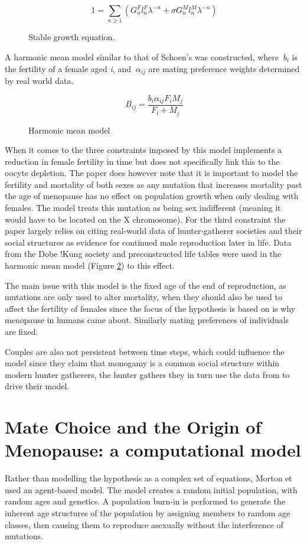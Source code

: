 \documentclass[authoryearcitations]{UoYCSproject}
\begin{document}
\begin{figure}[h]
$$\ 1 = \sum_{n\geq 1}(G_n^Fl_n^F\lambda ^{-n} + \sigma G_n^Ml_n^M\lambda ^{-n}) $$
\caption{Stable growth equation.}
\label{fig:stableGrowth}
\end{figure}


A harmonic mean model similar to that of Schoen's \cite{schoen1981harmonic} was constructed, where $\ b_i $ is the fertility of a female aged \textit{i}, and $\ \alpha_{ij} $ are mating preference weights determined by real world data.

\begin{figure}[h]
$$\ B_{ij} = \frac{b_i\alpha_{ij}F_iM_j}{F_i + M_j} $$
\caption{Harmonic mean model}
\label{fig:harmonicMean}
\end{figure}

When it comes to the three constraints imposed by \cite{patriarchHypothesis2000} this model implements a reduction in female fertility in time but does not specifically link this to the oocyte depletion. The paper does however note that it is important to model the fertility and mortality of both sexes as any mutation that increases mortality past the age of menopause has no effect on population growth when only dealing with females. The model treats this mutation as being sex indifferent (meaning it would have to be located on the X chromosome). For the third constraint the paper largely relies on citing real-world data of hunter-gatherer societies and their social structures as evidence for continued male reproduction later in life. Data from the Dobe !Kung society \cite{howell1979demography} and preconstructed life tables \cite{gurven2007hunter} were used in the harmonic mean model (Figure \ref{fig:harmonicMean}) to this effect.

The main issue with this model is the fixed age of the end of reproduction, as mutations are only used to alter mortality, when they should also be used to affect the fertility of females since the focus of the hypothesis is based on is why menopause in humans came about. Similarly mating preferences of individuals are fixed.

Couples are also not persistent between time steps, which could influence the model since they claim that monogamy is a common social structure within modern hunter gatherers, the hunter gathers they in turn use the data from to drive their model. 

\section{Mate Choice and the Origin of Menopause: a computational model}
Rather than modelling the hypothesis as a complex set of equations, Morton et \cite{mateChoice2013} used an agent-based model. The model creates a random initial population, with random ages and genetics. A population burn-in is performed to generate the inherent age structures of the population by assigning members to random age classes, then causing them to reproduce asexually without the interference of mutations.
\end{document}
